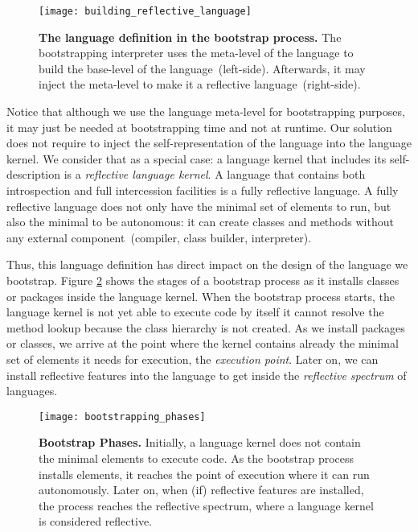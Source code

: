 \begin{figure}[ht]
\center
\texttt{[image: building\_reflective\_language]}
\caption{\textbf{The language definition in the bootstrap process.} The bootstrapping interpreter uses the meta-level of the language to build the base-level of the language~(left-side). Afterwards, it may inject the meta-level to make it a reflective language~(right-side).\label{fig:language_definition}}
\end{figure}

Notice that although we use the language meta-level for bootstrapping purposes, it may just be needed at bootstrapping time and not at runtime. Our solution does not require to inject the self-representation of the language into the language kernel. We consider that as a special case: a language kernel that includes its self-description is a \emph{reflective language kernel}.
A language that contains both introspection and full intercession facilities is a fully reflective language. A fully reflective language does not only have the minimal set of elements to run, but also the minimal to be autonomous: it can create classes and methods without any external component~(compiler, class builder, interpreter).

Thus, this language definition has direct impact on the design of the language we bootstrap. Figure \ref{fig:phases} shows the stages of a bootstrap process as it installs classes or packages inside the language kernel. When the bootstrap process starts, the language kernel is not yet able to execute code by itself \eg it cannot resolve the method lookup because the class hierarchy is not created. As we install packages or classes, we arrive at the point where the kernel contains already the minimal set of elements it needs for execution, the \emph{execution point}. Later on, we can install reflective features into the language to get inside the \emph{reflective spectrum} of languages. 



\begin{figure}[ht]
\center
\texttt{[image: bootstrapping\_phases]}
\caption{\textbf{Bootstrap Phases.} Initially, a language kernel does not contain the minimal elements to execute code. As the bootstrap process installs elements, it reaches the point of execution where it can run autonomously. Later on, when (if) reflective features are installed, the process reaches the reflective spectrum, where a language kernel is considered reflective.\label{fig:phases}}
\end{figure}

